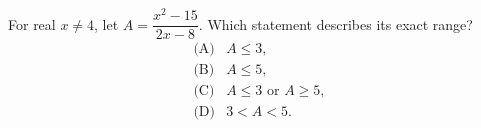 For real $x\ne4$, let $A=\dfrac{x^2-15}{2x-8}$. Which statement describes its exact range?
\[
\begin{array}{ll}
\text{(A)}&A\le3,\\
\text{(B)}&A\le5,\\
\text{(C)}&A\le3\text{ or }A\ge5,\\
\text{(D)}&3<A<5.
\end{array}
\]
